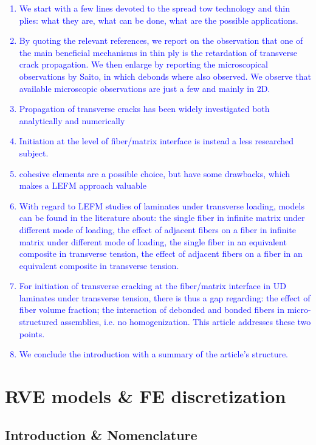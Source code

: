 \documentclass[review]{elsarticle}
\begin{document}
\textcolor{blue}{
\begin{enumerate}
\item We start with a few lines devoted to the spread tow technology and thin plies: what they are, what can be done, what are the possible applications.
\item By quoting the relevant references, we report on the observation that one of the main beneficial mechanisms in thin ply is the retardation of transverse crack propagation. We then enlarge by reporting the microscopical observations by Saito, in which debonds where also observed. We observe that available microscopic observations are just a few and mainly in 2D.
\item Propagation of transverse cracks has been widely investigated both analytically and numerically
\item Initiation at the level of fiber/matrix interface is instead a less researched subject.
\item cohesive elements are a possible choice, but have some drawbacks, which makes a LEFM approach valuable
\item With regard to LEFM studies of laminates under transverse loading, models can be found in the literature about: the single fiber in infinite matrix under different mode of loading, the effect of adjacent fibers on a fiber in infinite matrix under different mode of loading, the single fiber in an equivalent composite in transverse tension, the effect of adjacent fibers on a fiber in an equivalent composite in transverse tension.
\item For initiation of transverse cracking at the fiber/matrix interface in UD laminates under transverse tension, there is thus a gap regarding: the effect of fiber volume fraction; the interaction of debonded and bonded fibers in micro-structured assemblies, i.e. no homogenization. This article addresses these two points.
\item We conclude the introduction with a summary of the article's structure.
\end{enumerate}
}

\section{RVE models \& FE discretization}

\subsection{Introduction \& Nomenclature}\label{subsec:names}
\end{document}
